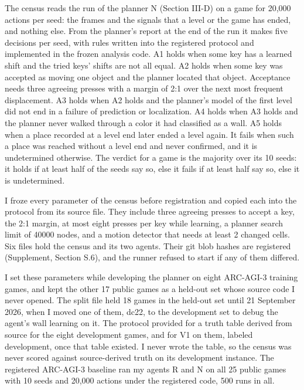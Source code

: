 \documentclass[journal]{IEEEtran}
\begin{document}
The census reads the run of the planner N (Section III-D) on a game for
20,000 actions per seed: the frames and the signals that a level or the
game has ended, and nothing else. From the planner's report at the end
of the run it makes five decisions per seed, with rules written into the
registered protocol and implemented in the frozen analysis code. A1
holds when some key has a learned shift and the tried keys' shifts are
not all equal. A2 holds when some key was accepted as moving one object
and the planner located that object. Acceptance needs three agreeing
presses with a margin of 2:1 over the next most frequent displacement.
A3 holds when A2 holds and the planner's model of the first level did
not end in a failure of prediction or localization. A4 holds when A3
holds and the planner never walked through a color it had classified as
a wall. A5 holds when a place recorded at a level end later ended a
level again. It fails when such a place was reached without a level end
and never confirmed, and it is undetermined otherwise. The verdict for a
game is the majority over its 10 seeds: it holds if at least half of the
seeds say so, else it fails if at least half say so, else it is
undetermined.

I froze every parameter of the census before registration and copied
each into the protocol from its source file. They include three agreeing
presses to accept a key, the 2:1 margin, at most eight presses per key
while learning, a planner search limit of 40000 nodes, and a motion
detector that needs at least 2 changed cells. Six files hold the census
and its two agents. Their git blob hashes are registered (Supplement,
Section S.6), and the runner refused to start if any of them differed.

I set these parameters while developing the planner on eight ARC-AGI-3
training games, and kept the other 17 public games as a held-out set
whose source code I never opened. The split file held 18 games in the
held-out set until 21 September 2026, when I moved one of them, dc22, to
the development set to debug the agent's wall learning on it. The
protocol provided for a truth table derived from source for the eight
development games, and for V1 on them, labeled development, once that
table existed. I never wrote the table, so the census was never scored
against source-derived truth on its development instance. The registered
ARC-AGI-3 baseline ran my agents R and N on all 25 public games with 10
seeds and 20,000 actions under the registered code, 500 runs in all.
\end{document}
